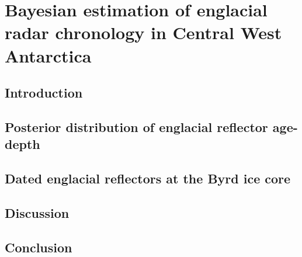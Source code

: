
\chapter{Bayesian estimation of englacial radar chronology in Central West Antarctica}\label{layers}


 

\section{Introduction}\label{intro}
	

\section{Posterior distribution of englacial reflector age-depth}\label{byrdchronology}
	
  
  \label{radardepth}
  
	
\section{Dated englacial reflectors at the Byrd ice core}\label{agedepthresults}
	

\section{Discussion}\label{discussion}
	
	
\section{Conclusion}\label{conclusion}
	





